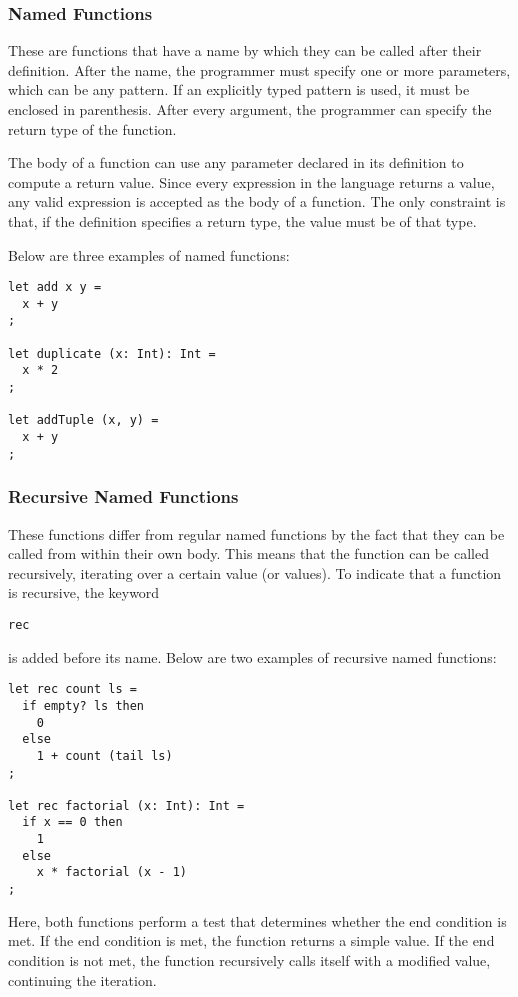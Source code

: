 \documentclass{article}
\def\code#1{\begin{footnotesize}\texttt{#1}\end{footnotesize}}
\begin{document}
\subsubsection{Named Functions}

These are functions that have a name by which they can be called after their definition.
After the name, the programmer must specify one or more parameters, which can be any pattern.
If an explicitly typed pattern is used, it must be enclosed in parenthesis.
After every argument, the programmer can specify the return type of the function.

The body of a function can use any parameter declared in its definition to compute a return value.
Since every expression in the language returns a value, any valid expression is accepted as the body of a function.
The only constraint is that, if the definition specifies a return type, the value must be of that type.

Below are three examples of named functions:

\begin{lstlisting}
let add x y =
  x + y
;

let duplicate (x: Int): Int =
  x * 2
;

let addTuple (x, y) =
  x + y
;
\end{lstlisting}

\subsubsection{Recursive Named Functions}

These functions differ from regular named functions by the fact that they can be called from within their own body.
This means that the function can be called recursively, iterating over a certain value (or values).
To indicate that a function is recursive, the keyword \code{rec} is added before its name.
Below are two examples of recursive named functions:

\begin{lstlisting}
let rec count ls =
  if empty? ls then
    0
  else
    1 + count (tail ls)
;

let rec factorial (x: Int): Int =
  if x == 0 then
    1
  else
    x * factorial (x - 1)
;
\end{lstlisting}

Here, both functions perform a test that determines whether the end condition is met.
If the end condition is met, the function returns a simple value.
If the end condition is not met, the function recursively calls itself with a modified value, continuing the iteration.
\end{document}
